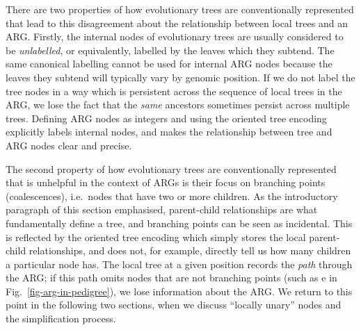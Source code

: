 \documentclass{article}
\newcommand{\noderef}[1]{\textsf{#1}}
\begin{document}
There are two properties of how evolutionary trees are conventionally
represented that lead to this
disagreement about the relationship between local trees and an ARG.
Firstly, the internal nodes of evolutionary trees are usually considered to be
\emph{unlabelled}, or equivalently, labelled by the leaves which they subtend.
The same canonical labelling cannot be used for internal ARG nodes because the
leaves they subtend will typically vary by genomic position. If we do not label
the tree nodes in a way which is persistent across the sequence of local trees
in the ARG, we lose the fact that the \emph{same} ancestors sometimes persist
across multiple trees.
Defining ARG nodes as integers and using the oriented
tree encoding explicitly labels internal nodes, and makes the relationship
between tree and ARG nodes clear and precise.

The second property of how evolutionary trees
are conventionally represented that is unhelpful in the context of ARGs is their
focus on branching points (coalescences), i.e.\ nodes that have two or more children.
As the introductory paragraph of this section emphasised,
parent-child relationships are what fundamentally define a tree,
and branching points can be seen as incidental. This is reflected
by the oriented tree encoding which simply stores the local
parent-child relationships, and does not, for example,
directly tell us how many children a particular node has.
The local tree at a given position records the \emph{path} through
the ARG; if this path omits nodes that are not
branching points (such as \noderef{e} in Fig.~\ref{fig-arg-in-pedigree}),
we lose information about the ARG.
We return to this point in the following two sections,
when we discuss ``locally unary'' nodes and the simplification process.
\end{document}

